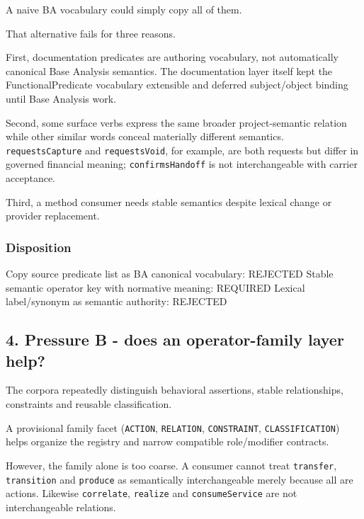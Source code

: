 \documentclass[
  10pt,
  letterpaper,
]{article}
\newenvironment{Shaded}{}{}
\newcommand{\NormalTok}[1]{#1}
\begin{document}
A naive BA vocabulary could simply copy all of them.

That alternative fails for three reasons.

First, documentation predicates are authoring vocabulary, not
automatically canonical Base Analysis semantics. The documentation layer
itself kept the FunctionalPredicate vocabulary extensible and deferred
subject/object binding until Base Analysis work.

Second, some surface verbs express the same broader project-semantic
relation while other similar words conceal materially different
semantics. \texttt{requestsCapture} and \texttt{requestsVoid}, for
example, are both requests but differ in governed financial meaning;
\texttt{confirmsHandoff} is not interchangeable with carrier acceptance.

Third, a method consumer needs stable semantics despite lexical change
or provider replacement.

\subsubsection{Disposition}\label{disposition}

\begin{Shaded}
\begin{Highlighting}[]
\NormalTok{Copy source predicate list as BA canonical vocabulary: REJECTED}
\NormalTok{Stable semantic operator key with normative meaning: REQUIRED}
\NormalTok{Lexical label/synonym as semantic authority: REJECTED}
\end{Highlighting}
\end{Shaded}

\subsection{4. Pressure B - does an operator-family layer
help?}\label{pressure-b---does-an-operator-family-layer-help}

The corpora repeatedly distinguish behavioral assertions, stable
relationships, constraints and reusable classification.

A provisional family facet (\texttt{ACTION}, \texttt{RELATION},
\texttt{CONSTRAINT}, \texttt{CLASSIFICATION}) helps organize the
registry and narrow compatible role/modifier contracts.

However, the family alone is too coarse. A consumer cannot treat
\texttt{transfer}, \texttt{transition} and \texttt{produce} as
semantically interchangeable merely because all are actions. Likewise
\texttt{correlate}, \texttt{realize} and \texttt{consumeService} are not
interchangeable relations.
\end{document}
